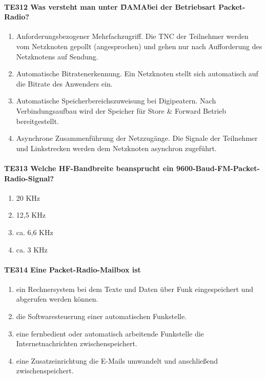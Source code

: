 \documentclass[8pt]{article}
\begin{document}
\begin{enumerate}
\begin{enumerate}[nolistsep,label=\Alph*]
\paragraph*{TE312 Was versteht man unter \"DAMA\" bei der Betriebsart Packet-Radio?}
\begin{enumerate}[nolistsep,label=\Alph*]
\item Anforderungsbezogener Mehrfachzugriff. Die TNC der Teilnehmer werden vom Netzknoten gepollt (angesprochen) und gehen nur nach Aufforderung des Netzknotens auf Sendung.
\item Automatische Bitratenerkennung. Ein Netzknoten stellt sich automatisch auf die Bitrate des Anwenders ein.
\item Automatische Speicherbereichszuweisung bei Digipeatern. Nach Verbindungsaufbau wird der Speicher für Store \& Forward Betrieb bereitgestellt.
\item Asynchrone Zusammenführung der Netzzugänge. Die Signale der Teilnehmer und Linkstrecken werden dem Netzknoten asynchron zugeführt.
\end{enumerate}

\paragraph*{TE313 Welche HF-Bandbreite beansprucht ein 9600-Baud-FM-Packet-Radio-Signal?}
\begin{enumerate}[nolistsep,label=\Alph*]
\item 20 KHz
\item 12,5 KHz
\item ca. 6,6 KHz
\item ca. 3 KHz
\end{enumerate}

\paragraph*{TE314 Eine Packet-Radio-Mailbox ist}
\begin{enumerate}[nolistsep,label=\Alph*]
\item ein Rechnersystem bei dem Texte und Daten über Funk eingespeichert und abgerufen werden können.
\item die Softwaresteuerung einer automatischen Funkstelle.
\item eine fernbedient oder automatisch arbeitende Funkstelle die Internetnachrichten zwischenspeichert.
\item eine Zusatzeinrichtung die E-Mails umwandelt und anschließend zwischenspeichert.
\end{enumerate}


\end{enumerate}
\end{enumerate}
\end{document}
